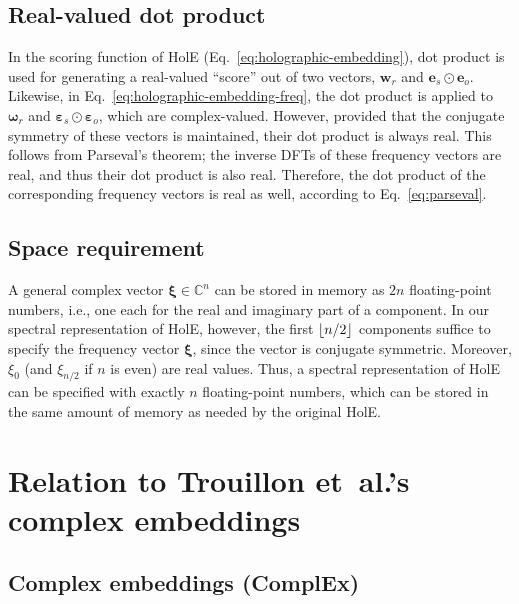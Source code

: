 \documentclass[11pt,a4paper]{article}
\DeclarePairedDelimiter{\floor}{\lfloor}{\rfloor}
\def\mat#1{\boldsymbol{\mathbf{#1}}}
\def\Cset{\mathbb{C}}
\let\hprod\odot
\begin{document}
\subsection{Real-valued dot product}

In the scoring function of HolE (Eq.~\eqref{eq:holographic-embedding}),
dot product is used for generating a real-valued
``score'' out of two vectors,
$\mat{w}_r$ and $\mat{e}_s \hprod \mat{e}_o$.
Likewise, 
in Eq.~\eqref{eq:holographic-embedding-freq},
the dot product is applied to
$\mat{\omega}_r$ and $\mat{\varepsilon}_s \hprod \mat{\varepsilon}_o$, which are complex-valued.
However, provided that the conjugate symmetry of these vectors is maintained,
their dot product is always real.
This follows from Parseval's theorem;
the inverse DFTs of these frequency vectors are real, and thus their dot product is also real.
Therefore, the dot product of the corresponding frequency vectors is real as well,
according to Eq.~\eqref{eq:parseval}.

\subsection{Space requirement}
\label{sec:space}

A general complex vector $\mat{\xi} \in \Cset^n$ can be stored in memory as $2n$ floating-point numbers,
i.e., one each for the real and imaginary part of a component.
In our spectral representation of HolE, however,
the first $\floor{n/2}$ components suffice to specify the frequency vector $\mat{\xi}$,
since the vector is conjugate symmetric.
Moreover, $\xi_0$ (and $\xi_{n/2}$ if $n$ is even) are real values.
Thus, a spectral representation of HolE can be specified with exactly $n$ floating-point numbers,
which can be stored in the same amount of memory as needed by the original HolE.


\section{Relation to Trouillon et~al.'s complex embeddings}
\label{sec:relation-to-complex-embedding}

\subsection{Complex embeddings (ComplEx)}
\label{sec:complex-embedding}
\end{document}
